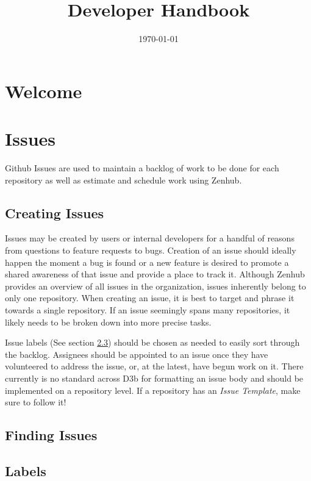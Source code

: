 \documentclass[a4paper,12pt,titlepage]{scrartcl}
\title{Developer Handbook}
\date{\today}
\begin{document}
	\maketitle
	
	\tableofcontents
	\newpage
   
	\section{Welcome}
   
 	\section{Issues}
 	
 	Github Issues are used to maintain a backlog of work to be done for each repository as well as estimate and schedule work using Zenhub.
 	
	\subsection{Creating Issues}
	
	Issues may be created by users or internal developers for a handful of reasons from questions to feature requests to bugs.
	Creation of an issue should ideally happen the moment a bug is found or a new feature is desired to promote a shared awareness of that issue and provide a place to track it.
	Although Zenhub provides an overview of all issues in the organization, issues inherently belong to only one repository.
	When creating an issue, it is best to target and phrase it towards a single repository.
	If an issue seemingly spans many repositories, it likely needs to be broken down into more precise tasks.
	
	Issue labels (See section \ref{labels}) should be chosen as needed to easily sort through the backlog.
	Assignees should be appointed to an issue once they have volunteered to address the issue, or, at the latest, have begun work on it.
	There currently is no standard across D3b for formatting an issue body and should be implemented on a repository level.
	If a repository has an {\em Issue Template}, make sure to follow it!
      
	\subsection{Finding Issues}
	
	
	
	\subsection{Labels}\label{labels}
	
\end{document}
